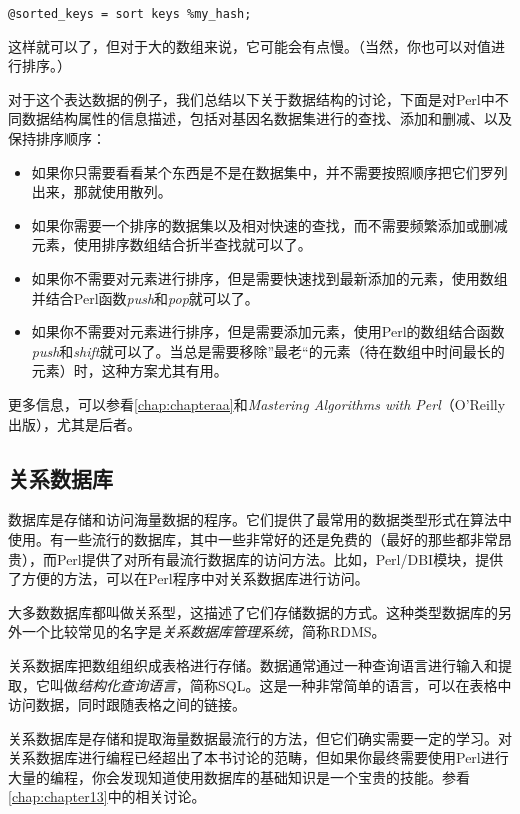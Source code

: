 \begin{lstlisting}
@sorted_keys = sort keys %my_hash;
\end{lstlisting}

这样就可以了，但对于大的数组来说，它可能会有点慢。（当然，你也可以对值进行排序。）

对于这个表达数据的例子，我们总结以下关于数据结构的讨论，下面是对Perl中不同数据结构属性的信息描述，包括对基因名数据集进行的查找、添加和删减、以及保持排序顺序：

\begin{itemize}
  \item 如果你只需要看看某个东西是不是在数据集中，并不需要按照顺序把它们罗列出来，那就使用散列。
  \item 如果你需要一个排序的数据集以及相对快速的查找，而不需要频繁添加或删减元素，使用排序数组结合折半查找就可以了。
  \item
    如果你不需要对元素进行排序，但是需要快速找到最新添加的元素，使用数组并结合Perl函数\textit{push}和\textit{pop}就可以了。
  \item
    如果你不需要对元素进行排序，但是需要添加元素，使用Perl的数组结合函数\textit{push}和\textit{shift}就可以了。当总是需要移除”最老“的元素（待在数组中时间最长的元素）时，这种方案尤其有用。
\end{itemize}

更多信息，可以参看\autoref{chap:chapteraa}和\textit{Mastering Algorithms with Perl}（O'Reilly出版），尤其是后者。

\subsection{关系数据库}
数据库是存储和访问海量数据的程序。它们提供了最常用的数据类型形式在算法中使用。有一些流行的数据库，其中一些非常好的还是免费的（最好的那些都非常昂贵），而Perl提供了对所有最流行数据库的访问方法。比如，Perl/DBI模块，提供了方便的方法，可以在Perl程序中对关系数据库进行访问。

大多数数据库都叫做关系型，这描述了它们存储数据的方式。这种类型数据库的另外一个比较常见的名字是\textit{关系数据库管理系统}，简称RDMS。

关系数据库把数组组织成表格进行存储。数据通常通过一种查询语言进行输入和提取，它叫做\textit{结构化查询语言}，简称SQL。这是一种非常简单的语言，可以在表格中访问数据，同时跟随表格之间的链接。

关系数据库是存储和提取海量数据最流行的方法，但它们确实需要一定的学习。对关系数据库进行编程已经超出了本书讨论的范畴，但如果你最终需要使用Perl进行大量的编程，你会发现知道使用数据库的基础知识是一个宝贵的技能。参看\autoref{chap:chapter13}中的相关讨论。


